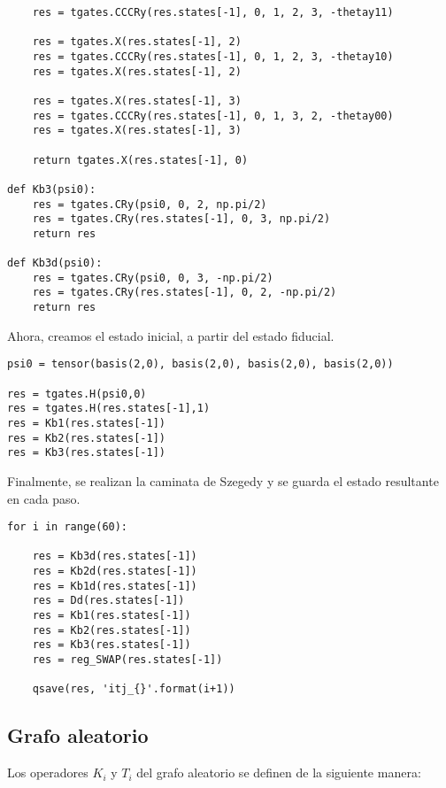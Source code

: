 \begin{verbatim}
    res = tgates.CCCRy(res.states[-1], 0, 1, 2, 3, -thetay11)

    res = tgates.X(res.states[-1], 2)
    res = tgates.CCCRy(res.states[-1], 0, 1, 2, 3, -thetay10)
    res = tgates.X(res.states[-1], 2)

    res = tgates.X(res.states[-1], 3)
    res = tgates.CCCRy(res.states[-1], 0, 1, 3, 2, -thetay00)
    res = tgates.X(res.states[-1], 3)

    return tgates.X(res.states[-1], 0)

def Kb3(psi0):
    res = tgates.CRy(psi0, 0, 2, np.pi/2)
    res = tgates.CRy(res.states[-1], 0, 3, np.pi/2)
    return res

def Kb3d(psi0):
    res = tgates.CRy(psi0, 0, 3, -np.pi/2)
    res = tgates.CRy(res.states[-1], 0, 2, -np.pi/2)
    return res
\end{verbatim}

Ahora, creamos el estado inicial, a partir del estado fiducial.

\begin{verbatim}
psi0 = tensor(basis(2,0), basis(2,0), basis(2,0), basis(2,0))

res = tgates.H(psi0,0)
res = tgates.H(res.states[-1],1)
res = Kb1(res.states[-1])
res = Kb2(res.states[-1])
res = Kb3(res.states[-1])
\end{verbatim}

Finalmente, se realizan la caminata de Szegedy y se guarda el estado resultante en cada paso.

\begin{verbatim}
for i in range(60):
    
    res = Kb3d(res.states[-1])
    res = Kb2d(res.states[-1])
    res = Kb1d(res.states[-1])
    res = Dd(res.states[-1])
    res = Kb1(res.states[-1])
    res = Kb2(res.states[-1])
    res = Kb3(res.states[-1])
    res = reg_SWAP(res.states[-1])
    
    qsave(res, 'itj_{}'.format(i+1))

\end{verbatim}

\subsection{Grafo aleatorio}

Los operadores $K_i$ y $T_i$ del grafo aleatorio se definen de la siguiente manera:

